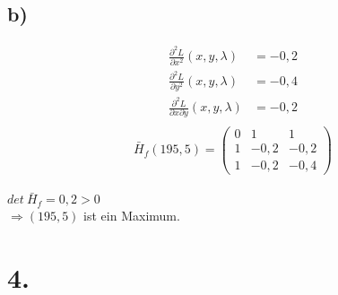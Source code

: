 \documentclass[a4paper]{scrartcl}
\begin{document}
\subsection{b)}
\begin{align}
\frac{\partial ^2L}{\partial x^2}(x,y,\lambda)&=-0,2 \\
\frac{\partial ^2L}{\partial y^2}(x,y,\lambda)&=-0,4 \\
\frac{\partial ^2L}{\partial x \partial y}(x,y,\lambda)&=-0,2 \\
\end{align}
\[\bar{H}_f(195,5)=
\begin{pmatrix}
0 & 1 & 1 \\
1 & -0,2 & -0,2 \\
1 & -0,2 & -0,4
\end{pmatrix}
\] \\
\(det\ \bar{H}_f=0,2>0\) \\
\(\Rightarrow (195,5)\) ist ein Maximum.
\newpage
\section{4.}
\end{document}

